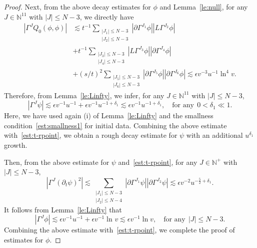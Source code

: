 \documentclass[a4paper,reqno]{amsart}
\theoremstyle{definition}
\numberwithin{equation}{section}
\def \pt{\partial_{t}}
\begin{document}
\begin{proof}
\smallskip
Next, from the above decay estimates for $\phi$ and Lemma~\ref{le:null}, for any $J\in \mathbb{N}^{11}$ with $|J|\le N-3$, we directly have
\begin{equation*}
\begin{aligned}
     |\Gamma^{J}Q_{0}(\phi,\phi)|
    &\lesssim t^{-1}\sum_{\substack{|J_{1}|\le N-3\\ |J_{2}|\le N-3}}
    |\partial \Gamma^{J_{1}}\phi|
    |L\Gamma^{J_{2}}\phi|\\
    &+t^{-1}\sum_{\substack{|J_{3}|\le N-3\\ |J_{4}|\le N-3}}
    |L\Gamma^{J_{3}}\phi|
    |\partial\Gamma^{J_{4}}\phi|\\
    &+(s/t)^{2}\sum_{\substack{|J_{5}|\le N-3\\ |J_{6}|\le N-3}}
    |\partial\Gamma^{J_{5}}\phi|
    |\partial\Gamma^{J_{6}}\phi|\lesssim \epsilon v^{-3}u^{-1}\ln^{4}v.
\end{aligned}
\end{equation*}
Therefore, from Lemma~\ref{le:Linfty},  we infer, for any $J\in \mathbb{N}^{11}$ with $|J|\le N-3$,
\begin{equation*}
    \left| \Gamma^{J}\psi\right|\lesssim \epsilon v^{-1}u^{-1}+\epsilon v^{-1}u^{-1+\delta_{1}}\lesssim \epsilon v^{-1}u^{-1+\delta_{1}},\quad \mbox{for any}\ \ 0<\delta_{1}\ll 1.
\end{equation*}
Here, we have used again (i) of Lemma~\ref{le:Linfty} and the smallness condition~\eqref{est:smallness1} for initial data.
Combining the above estimate with~\eqref{est:t-rpoint}, we obtain a rough decay estimate for $\psi$ with an additional $u^{\delta_{1}}$ growth.

\smallskip
Then, from the above estimate for $\psi$ and~\eqref{est:t-rpoint}, for any $J\in \mathbb{N}^{+}$ with $|J|\le N-3$, 
\begin{equation*}
    \left| \Gamma^{J}(\pt \psi )^{2}\right|
    \lesssim \sum_{\substack{|J_{1}|\le N-3\\ |J_{2}|\le N-4}}
    \left|\partial \Gamma^{J_{1}}\psi\right|
    \left|\partial \Gamma^{J_{2}}\psi\right|
    \lesssim \epsilon v^{-2}u^{-\frac{5}{2}+\delta_{1}}.
\end{equation*}
It follows from Lemma~\ref{le:Linfty} that 
\begin{equation*}
    \left|\Gamma^{J}\phi\right|
    \lesssim 
    \epsilon v^{-1}u^{-1}+
    \epsilon v^{-1}\ln^{}v
    \lesssim \epsilon v^{-1}\ln v,\quad 
    \mbox{for any} \ \ |J|\le N-3.
\end{equation*}
Combining the above estimate with~\eqref{est:t-rpoint}, we complete the proof of estimates for $\phi$.


\end{proof}
\end{document}
